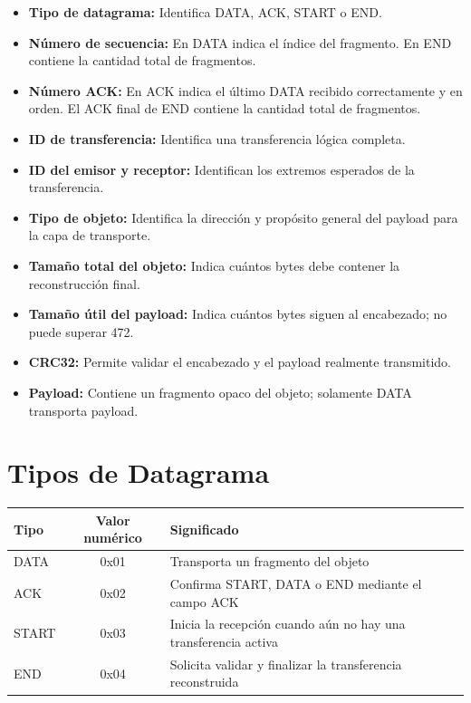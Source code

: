 \documentclass[12pt]{article}
\begin{document}
\begin{itemize}
\item \textbf{Tipo de datagrama:} Identifica DATA, ACK, START o END.
\item \textbf{Número de secuencia:} En DATA indica el índice del fragmento. En END contiene la cantidad total de fragmentos.
\item \textbf{Número ACK:} En ACK indica el último DATA recibido correctamente y en orden. El ACK final de END contiene la cantidad total de fragmentos.
\item \textbf{ID de transferencia:} Identifica una transferencia lógica completa.
\item \textbf{ID del emisor y receptor:} Identifican los extremos esperados de la transferencia.
\item \textbf{Tipo de objeto:} Identifica la dirección y propósito general del payload para la capa de transporte.
\item \textbf{Tamaño total del objeto:} Indica cuántos bytes debe contener la reconstrucción final.
\item \textbf{Tamaño útil del payload:} Indica cuántos bytes siguen al encabezado; no puede superar 472.
\item \textbf{CRC32:} Permite validar el encabezado y el payload realmente transmitido.
\item \textbf{Payload:} Contiene un fragmento opaco del objeto; solamente DATA transporta payload.
\end{itemize}

\section{Tipos de Datagrama}

\begin{table}[h]
\centering
\begin{tabular}{|l|c|p{8cm}|}
\hline
Tipo & Valor numérico & Significado \\
\hline
DATA & 0x01 & Transporta un fragmento del objeto \\
\hline
ACK & 0x02 & Confirma START, DATA o END mediante el campo ACK \\
\hline
START & 0x03 & Inicia la recepción cuando aún no hay una transferencia activa \\
\hline
END & 0x04 & Solicita validar y finalizar la transferencia reconstruida \\
\hline
\end{tabular}
\end{table}
\end{document}
